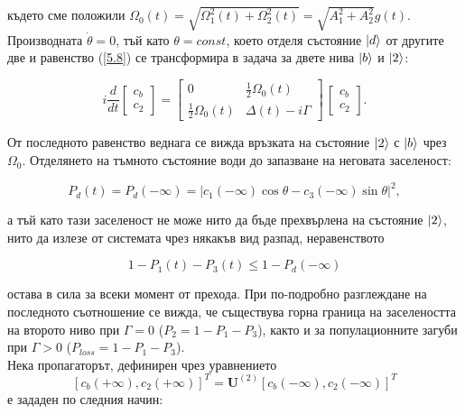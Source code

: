     където сме положили $\Omega_0(t) = \sqrt{\Omega_1^2(t) + \Omega_2^2(t)} = \sqrt{A_1^2 + A_2^2}g(t)$. Производната $\dot{\theta} = 0$, тъй като $\theta = const$, което отделя състояние $\ket{d}$
    от другите две и равенство (\ref{5.8}) се трансформира в задача за двете нива $\ket{b}$ и $\ket{2}$:

    \begin{equation}
        \textit{i}\frac{d}{dt}\begin{bmatrix}
            c_b\\
            c_2
        \end{bmatrix} = \begin{bmatrix}
            0 & \frac{1}{2}\Omega_0(t)\\
            \frac{1}{2}\Omega_0(t) & \Delta(t)-\textit{i}\Gamma
        \end{bmatrix} \, \begin{bmatrix}
            c_b\\
            c_2
        \end{bmatrix}.
    \end{equation}

    От последното равенство веднага се вижда връзката на състояние $\ket{2}$ с $\ket{b}$ чрез $\Omega_0$. Отделянето на тъмното състояние води до запазване на неговата заселеност:

    \begin{equation}
        P_d(t) = P_d(-\infty) = \left|c_1(-\infty)\cos\theta - c_3(-\infty)\sin\theta\right|^2,
    \end{equation}

    а тъй като тази заселеност не може нито да бъде прехвърлена на състояние $\ket{2}$, нито да излезе от системата чрез някакъв вид разпад, неравенството

    \begin{equation}
        1-P_1(t) - P_3(t) \le 1-P_d(-\infty)
    \end{equation}

    остава в сила за всеки момент от прехода. При по-подробно разглеждане на последното съотношение се вижда, че съществува горна граница на заселеността на второто ниво при $\Gamma = 0$
    ($P_2 = 1 - P_1 - P_3$), както и за популационните загуби при $\Gamma > 0$ ($P_{loss} = 1 - P_1 - P_3$).\\
    Нека пропагаторът, дефинирен чрез уравнението
    \begin{equation} \label{5.12}
        \left[c_b(+\infty),c_2(+\infty)\right]^T = \mathbf{U}^{(2)} \left[c_b(-\infty),c_2(-\infty)\right]^T
    \end{equation}
    е зададен по следния начин:

